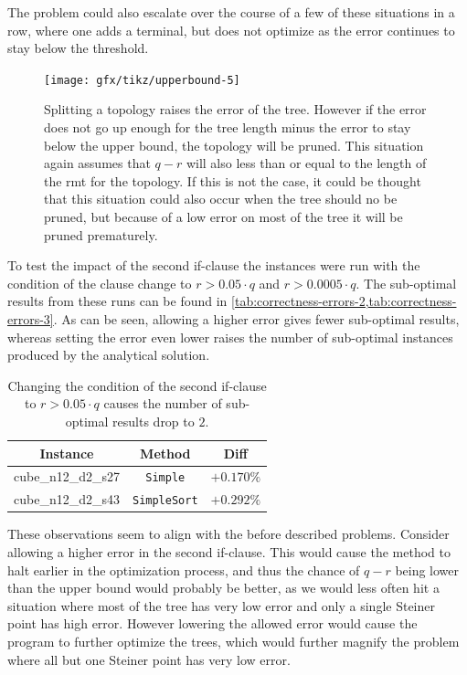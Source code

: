 The problem could also escalate over the course of a few of these situations in
a row, where one adds a terminal, but does not optimize as the error continues
to stay below the threshold.

\begin{figure}[htbp]
  \centering
  \texttt{[image: gfx/tikz/upperbound-5]}
  \caption[Upper bounds, 5]{Splitting a topology raises the error of the tree.
    However if the error does not go up enough for the tree length minus the error to
    stay below the upper bound, the topology will be pruned. This situation
    again assumes that $q-r$ will also less than or equal to the length of the
    \ac{rmt} for the topology. If this is not the case, it could be thought that
    this situation could also occur when the tree should no be pruned, but
    because of a low error on most of the tree it will be pruned
    prematurely.\label{fig:upperbound-5}}
\end{figure}

To test the impact of the second if-clause the instances were run with the
condition of the clause change to $r > 0.05 \cdot q$ and $r > 0.0005 \cdot q$.
The sub-optimal results from these runs can be found in
\cref{tab:correctness-errors-2,tab:correctness-errors-3}. As can be seen, allowing a
higher error gives fewer sub-optimal results, whereas setting the error even
lower raises the number of sub-optimal instances produced by the analytical
solution.

\begin{table}[htbp]
  \centering
  \begin{tabular}{ccc}
    \toprule
    Instance           & Method              & Diff       \\
    \midrule
    cube\_n12\_d2\_s27 & \texttt{Simple}     & $+0.170\%$ \\
    cube\_n12\_d2\_s43 & \texttt{SimpleSort} & $+0.292\%$ \\
    \bottomrule
  \end{tabular}
  \caption[Sub-optimal results with condition $r > 0.05 \cdot q$]{Changing
    the condition of the second if-clause to $r > 0.05 \cdot q$ causes the
    number of sub-optimal results drop to $2$.\label{tab:correctness-errors-3}}
\end{table}

These observations seem to align with the before described problems.
Consider allowing a higher error in the second if-clause. This would cause the
method to halt earlier in the optimization process, and thus the chance of $q-r$
being lower than the upper bound would probably be better, as we would
less often hit a situation where most of the tree has very low error and only a
single Steiner point has high error. However lowering the allowed error would
cause the program to further optimize the trees, which would further magnify the
problem where all but one Steiner point has very low error.

